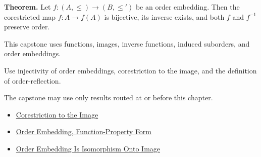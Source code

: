 \label{cap:functions-and-order}

\begin{tcolorbox}[
  colback=gray!6,
  colframe=gray!40,
  arc=2pt,
  left=8pt, right=8pt, top=6pt, bottom=6pt,
  title={\small\textbf{Capstone Theorem}},
  fonttitle=\small\bfseries
]
\textbf{Theorem.}
Let $f:(A,\leq)\to(B,\leq')$ be an order embedding. Then the corestricted
map $f:A\to f(A)$ is bijective, its inverse exists, and both $f$ and
$f^{-1}$ preserve order.
\end{tcolorbox}

\begin{remark*}
This capstone uses functions, images, inverse functions, induced suborders,
and order embeddings.
\end{remark*}

\begin{remark*}
Use injectivity of order embeddings, corestriction to the image, and the
definition of order-reflection.
\end{remark*}

\begin{remark*}
The capstone may use only results routed at or before this chapter.
\end{remark*}

\begin{dependencies}
\begin{itemize}
  \item \hyperref[def:corestriction-to-image]{Corestriction to the Image}
  \item \hyperref[def:order-embedding-function-form]{Order Embedding, Function-Property Form}
  \item \hyperref[thm:order-embedding-isomorphism-onto-image]{Order Embedding Is Isomorphism Onto Image}
\end{itemize}
\end{dependencies}

\clearpage
